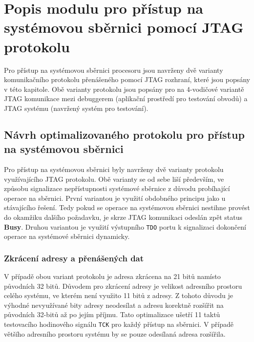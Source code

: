 \chapter{Popis modulu pro přístup na systémovou sběrnici pomocí JTAG protokolu}	\label{jtag_ap}
Pro přístup na systémovou sběrnici procesoru jsou navrženy dvě varianty komunikačního protokolu přenášeného pomocí JTAG rozhraní, které jsou popsány v této kapitole. Obě varianty protokolu jsou popsány pro na 4-vodičové variantě \acs{JTAG} komunikace mezi debuggerem (aplikační prostředí pro testování obvodů) a \acs{JTAG} systému (navržený systém pro testování).

\section{Návrh optimalizovaného protokolu pro přístup na systémovou sběrnici}	\label{sec:protokoly}
Pro přístup na systémovou sběrnici byly navrženy dvě varianty protokolu využívajícího JTAG protokolu. Obě varianty se od sebe liší především, ve způsobu signalizace nepřístupnosti systémové sběrnice z důvodu probíhající operace na sběrnici. První variantou je využití obdobného principu jako u stávajícího řešení. Tedy pokud se operace na systémovou sběrnici nestihne provést do okamžiku dalšího požadavku, je skrze JTAG komunikaci odeslán zpět status \textbf{Busy}. Druhou variantou je využití výstupního \texttt{\acs{TDO}} portu k signalizaci dokončení operace na systémové sběrnici dynamicky.

\subsection{Zkrácení adresy a přenášených dat}
V případě obou variant protokolu je adresa zkrácena na 21 bitů namísto původních 32 bitů. Důvodem pro zkrácení adresy je velikost adresního prostoru celého systému, ve kterém není využito 11 bitů z adresy. Z tohoto důvodu je výhodné nevyužívané bity adresy neodesílat a adresu korektně rozšířit na původních 32-bitů až po jejím příjmu. Tato optimalizace ušetří 11 taktů testovacího hodinového signálu \texttt{\acs{TCK}} pro každý přístup na sběrnici. V případě většího adresního prostoru systému by se pouze odesílaná adresa rozšířila.

